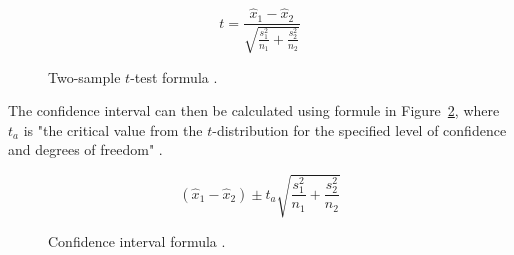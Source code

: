 \begin{figure}[H]
    \[ t = \displaystyle\frac{\hat{x}_1-\hat{x}_2}{\displaystyle\sqrt{\frac{s^2_1}{n_1}+\frac{s^2_2}{n_2}}} \]
    \caption{Two-sample $t$-test formula \parencite{sauro_chapter5_2016}.}
    \label{fig:hsie-two-sample-t-test}
\end{figure}

The confidence interval can then be calculated using formule in Figure~\ref{fig:hsie-confidence-interval-diff}, where $t_a$ is "the critical value from the $t$-distribution for the specified level of confidence and degrees of freedom" \parencite{sauro_chapter5_2016}.

\begin{figure}[H]
    \[ (\hat{x}_1-\hat{x}_2) \pm t_a\displaystyle\sqrt{\frac{s^2_1}{n_1}+\frac{s^2_2}{n_2}} \]
    \caption{Confidence interval formula \parencite{sauro_chapter5_2016}.}
    \label{fig:hsie-confidence-interval-diff}
\end{figure}
